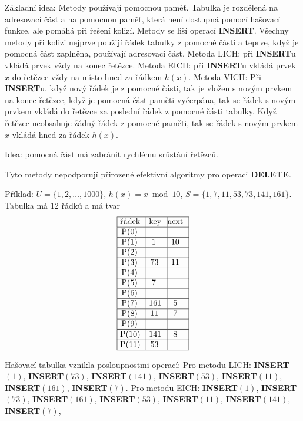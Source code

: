 \documentclass[a4paper,12pt]{article}
\begin{document}
Základní idea: Metody používají pomocnou pamě\v t. 
Tabulka je rozdělená na adresovací část a na pomocnou 
pamě\v t, která není dostupná pomocí hašovací funkce, 
ale pomáhá při řešení kolizí. Metody se liší operací 
{\bf INSERT}. Všechny metody při kolizi nejprve použijí řádek 
tabulky z pomocné části a teprve, když je pomocná část 
zaplněna, používají adresovací část.\newline 
Metoda LICH: při {\bf INSERT}u vkládá prvek vždy na konec 
ře\-těz\-ce.\newline 
Metoda EICH: při {\bf INSERT}u vkládá prvek $x$ do řetězce vždy 
na místo hned za řádkem $h(x)$.\newline 
Metoda VICH: Při {\bf INSERT}u, když nový řádek je z 
pomocné části, tak je vložen s novým prvkem na konec 
řetězce, když je pomocná část paměti vyčer\-pá\-na, tak se 
řádek s novým prvkem vkládá do řetězce za posled\-ní 
řádek z pomocné části tabulky. Když řetězec neobsahuje 
žádný řádek z pomocné paměti, tak se řádek s novým  prvkem $
x$ vkládá hned za řádek $h(x)$. 

Idea: pomocná část má zabránit rychlému 
srůstání řetězců.

Tyto metody nepodporují přirozené efektivní algoritmy 
pro ope\-raci {\bf DELETE}.

Příklad: $U=\{1,2,\dots,1000\}$, $h(x)=x\bmod10$,\newline 
$S=\{1,7,11,53,73,141,161\}$. Tabulka má 12 řádků a 
má tvar
$$\vtop{\offinterlineskip\halign {\strut\vrule\ # & \vrule\ # & \vrule \hfil # \hfil \vrule\cr\noalign{\hrule}řádek & key & next \hfil \cr\noalign{\hrule}P(0) & &\hfill \cr\noalign{\hrule}P(1) & 1 & 10 \cr\noalign{\hrule}P(2) & &\hfill \cr\noalign{\hrule}P(3) & 73 & 11 \cr\noalign{\hrule}P(4) &  &\hfill \cr\noalign{\hrule}P(5) & 7 & \hfill \cr\noalign{\hrule}P(6) & &\hfill \cr\noalign{\hrule}P(7) & 161 & 5 \cr\noalign{\hrule}P(8) & 11 & 7 \cr\noalign{\hrule}P(9) & &\hfill \cr\noalign{\hrule}\noalign{\hrule}P(10) & 141 & 8 \cr\noalign{\hrule}P(11) & 53 & \cr\noalign{\hrule}}}$$

Hašovací tabulka vznikla posloupnostmi operací:\newline 
Pro metodu LICH:\newline 
{\bf INSERT$(1)$}, {\bf INSERT$(73)$}, {\bf INSERT$(141)$}, 
{\bf INSERT$(53)$}, {\bf INSERT$(11)$},\newline 
{\bf INSERT$(161)$}, {\bf INSERT$(7)$}.\newline 
Pro metodu EICH:\newline 
{\bf INSERT$(1)$}, {\bf INSERT$(73)$}, {\bf INSERT$(161)$}, 
{\bf INSERT$(53)$}, {\bf INSERT$(11)$},\newline 
{\bf INSERT$(141)$}, {\bf INSERT$(7)$},
\end{document}
